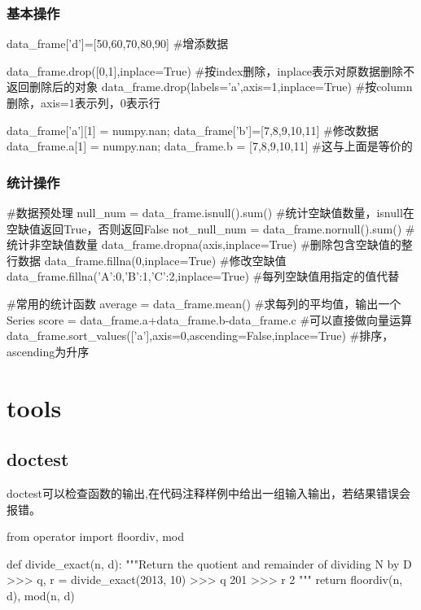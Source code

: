 \documentclass{article}
\begin{document}
      \subsubsection{基本操作}
        \begin{codeblock}[language=python, caption={Basic functions about DataFrame}]
          data_frame['d']=[50,60,70,80,90] #增添数据

          data_frame.drop([0,1],inplace=True) #按index删除，inplace表示对原数据删除不返回删除后的对象
          data_frame.drop(labels='a',axis=1,inplace=True) #按column删除，axis=1表示列，0表示行

          data_frame['a'][1] = numpy.nan; data_frame['b']=[7,8,9,10,11] #修改数据
          data_frame.a[1] = numpy.nan; data_frame.b = [7,8,9,10,11] #这与上面是等价的
        \end{codeblock}

      \subsubsection{统计操作}
        \begin{codeblock}[language=python, caption={Perform statistical operations using DataFrame}]
          #数据预处理
          null_num = data_frame.isnull().sum() #统计空缺值数量，isnull在空缺值返回True，否则返回False
          not_null_num = data_frame.nornull().sum() #统计非空缺值数量
          data_frame.dropna(axis,inplace=True) #删除包含空缺值的整行数据
          data_frame.fillna(0,inplace=True) #修改空缺值
          data_frame.fillna({'A':0,'B':1,'C':2},inplace=True) #每列空缺值用指定的值代替

          #常用的统计函数
          average = data_frame.mean() #求每列的平均值，输出一个Series
          score = data_frame.a+data_frame.b-data_frame.c #可以直接做向量运算
          data_frame.sort_values(['a'],axis=0,ascending=False,inplace=True) #排序，ascending为升序
        \end{codeblock}

  \section{tools}

    \subsection{doctest}
      doctest可以检查函数的输出,在代码注释样例中给出一组输入输出，若结果错误会报错。
      \begin{codeblock}[language=python, caption={doctest hello.py}]
        from operator import floordiv, mod

        def divide_exact(n, d):
          """Return the quotient and remainder of  dividing N by D
          >>> q, r = divide_exact(2013, 10)
          >>> q
          201
          >>> r
          2
          """
          return floordiv(n, d), mod(n, d)
      \end{codeblock}
\end{document}
